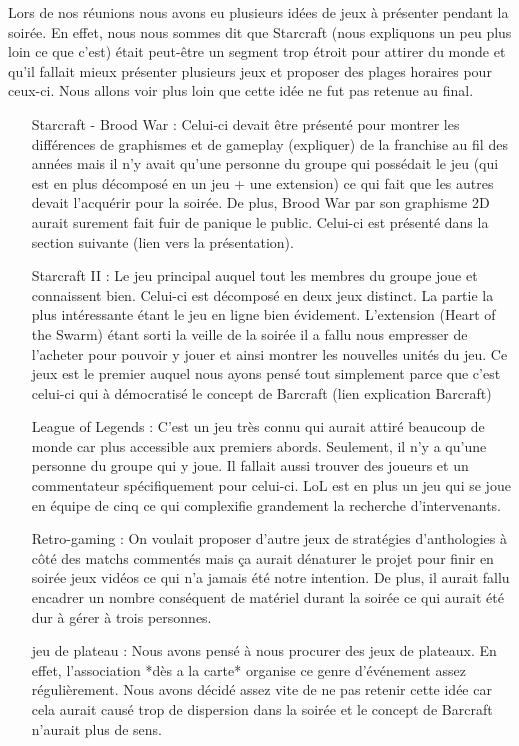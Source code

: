 Lors de nos réunions nous avons eu plusieurs idées de jeux à présenter
pendant la soirée. En effet, nous nous sommes dit que Starcraft (nous
expliquons un peu plus loin ce que c'est) était peut-être un segment
trop étroit pour attirer du monde et qu'il fallait mieux présenter
plusieurs jeux et proposer des plages horaires pour ceux-ci. Nous allons
voir plus loin que cette idée ne fut pas retenue au final.

\begin{itemize}

\item[Starcraft - Brood War :] Celui-ci devait être présenté pour
montrer les différences de graphismes et de gameplay (expliquer) de la
franchise au fil des années mais il n'y avait qu'une personne du groupe
qui possédait le jeu (qui est en plus décomposé en un jeu + une
extension) ce qui fait que les autres devait l'acquérir pour la soirée.
De plus, Brood War par son graphisme 2D aurait surement fait fuir de
panique le public.  Celui-ci est présenté dans la section suivante (lien
vers la présentation).

\item[Starcraft II :] Le jeu principal auquel tout les membres du groupe
joue et connaissent bien. Celui-ci est décomposé en deux jeux distinct.
La partie la plus intéressante étant le jeu en ligne bien évidement.
L'extension (Heart of the Swarm) étant sorti la veille de la soirée il a
fallu nous empresser de l'acheter pour pouvoir y jouer et ainsi montrer
les nouvelles unités du jeu. Ce jeux est le premier auquel nous ayons
pensé tout simplement parce que c'est celui-ci qui à démocratisé le
concept de Barcraft (lien explication Barcraft)

\item[League of Legends :] C'est un jeu très connu qui aurait attiré
beaucoup de monde car plus accessible aux premiers abords. Seulement, il
n'y a qu'une personne du groupe qui y joue. Il fallait aussi trouver des
joueurs et un commentateur spécifiquement pour celui-ci. LoL est en plus
un jeu qui se joue en équipe de cinq ce qui complexifie grandement la
recherche d'intervenants.

\item[Retro-gaming :] On voulait proposer d'autre jeux de stratégies
d'anthologies à côté des matchs commentés mais ça aurait dénaturer le
projet pour finir en soirée jeux vidéos ce qui n'a jamais été notre
intention. De plus, il aurait fallu encadrer un nombre conséquent de
matériel durant la soirée ce qui aurait été dur à gérer à trois
personnes.

\item[jeu de plateau :] Nous avons pensé à nous procurer des jeux de
plateaux. En effet, l'association *dès a la carte* organise ce genre
d'événement assez régulièrement. Nous avons décidé assez vite de ne pas
retenir cette idée car cela aurait causé trop de dispersion dans la
soirée et le concept de Barcraft n'aurait plus de sens.

\end{itemize}

